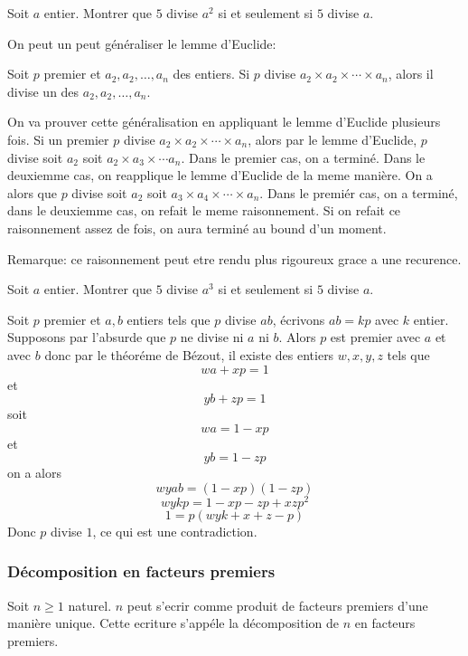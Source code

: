 \exo
Soit \(a\) entier.
Montrer que \(5\) divise \(a^2\) si et seulement si \(5\) divise \(a\).

On peut un peut généraliser le lemme d'Euclide:


Soit \(p\) premier et \(a_2 , a_2 , \ldots , a_{n}\) des entiers. Si \(p\) divise \(a_2 \times a_2 \times \cdots \times a_{n}\), alors il divise un des \(a_2 , a_2 , \ldots , a_{n}\).

\endgroup

\preuve

On va prouver cette généralisation en appliquant le lemme d'Euclide plusieurs fois.
Si un premier \(p\) divise \(a_2 \times a_2 \times \cdots \times a_{n}\), alors par le lemme d'Euclide, \(p\) divise soit \(a_2\) soit \(a_2 \times a_{3} \times \cdots a_{n}\). Dans le premier cas, on a terminé. Dans le deuxiemme cas, on reapplique le lemme d'Euclide de la meme manière. On a alors que \(p\) divise soit \(a_2\) soit \(a_{3} \times a_{4} \times \cdots \times a_{n}\). Dans le premiér cas, on a terminé, dans le deuxiemme cas, on refait le meme raisonnement. Si on refait ce raisonnement assez de fois, on aura terminé au bound d'un moment.

Remarque: ce raisonnement peut etre rendu plus rigoureux grace a une recurence.

\exo
Soit \(a\) entier.
Montrer que \(5\) divise \(a^{3}\) si et seulement si \(5\) divise \(a\).


Soit \(p\) premier et \(a, b\) entiers tels que \(p\) divise \(ab\), écrivons \(ab = kp\) avec \(k\) entier. Supposons par l'absurde que \(p\) ne divise ni \(a\) ni \(b\). Alors \(p\) est premier avec \(a\) et avec \(b\) donc par le théoréme de Bézout, il existe des entiers \(w, x, y, z\) tels que
\[wa + xp = 1\]
et
\[yb + zp = 1\]
soit
\[wa = 1 - xp\]
et
\[yb = 1 - zp\]
on a alors
\[wyab = \left(1 - xp\right)\left(1 - zp\right)\]
\[wykp = 1 - xp - zp + xzp^2\]
\[1 = p\left(wyk + x + z - p\right)\]
Donc \(p\) divise \(1\), ce qui est une contradiction.

\subsubsection{Décomposition en facteurs premiers}
Soit \(n\geqslant1\) naturel. \(n\) peut s'ecrir comme produit de facteurs premiers d'une manière unique. Cette ecriture s'appéle la décomposition de \(n\) en facteurs premiers.

